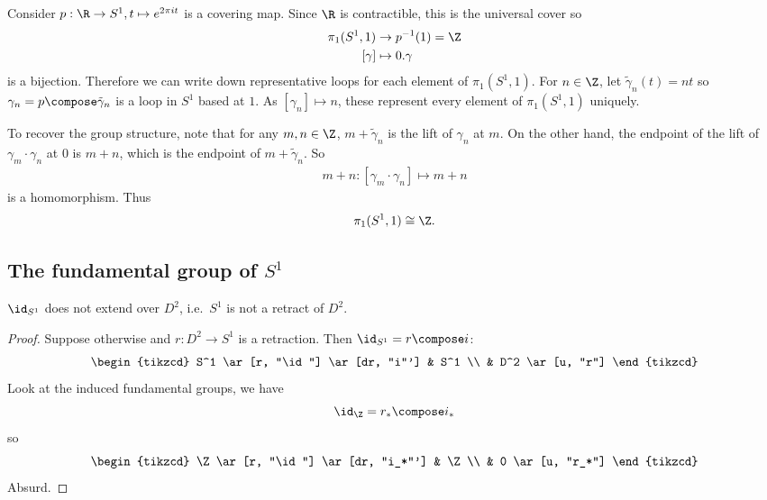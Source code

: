 \documentclass[a4paper]{article}
\begin{document}
\begin{eg}
  Consider \(p: \R \to S^1, t \mapsto e^{2\pi it}\) is a covering map. Since \(\R\) is contractible, this is the universal cover so
  \begin{align*}
    \pi_1(S^1, 1) &\to p^{-1}(1) = \Z \\
    [\gamma] &\mapsto 0. \gamma
  \end{align*}
  is a bijection. Therefore we can write down representative loops for each element of \(\pi_1(S^1, 1)\). For \(n \in \Z\), let \(\tilde \gamma_n(t) = nt\) so \(\gamma_n = p \compose \tilde \gamma_n\) is a loop in \(S^1\) based at \(1\). As \([\gamma_n] \mapsto n\), these represent every element of \(\pi_1(S^1, 1)\) uniquely.

  To recover the group structure, note that for any \(m, n \in \Z\), \(m + \tilde \gamma_n\) is the lift of \(\gamma_n\) at \(m\). On the other hand, the endpoint of the lift of \(\gamma_m \cdot \gamma_n\) at \(0\) is \(m + n\), which is the endpoint of \(m + \tilde \gamma_n\). So
  \begin{align*}
    m+n: [\gamma_m \cdot \gamma_n] \mapsto m + n
  \end{align*}
  is a homomorphism. Thus
  \[
    \pi_1(S^1, 1) \cong \Z.
  \]
\end{eg}

\subsection{The fundamental group of \(S^1\)}

\begin{theorem}
  \(\id_{S^1}\) does not extend over \(D^2\), i.e.\ \(S^1\) is not a retract of \(D^2\).
\end{theorem}

\begin{proof}
  Suppose otherwise and \(r: D^2 \to S^1\) is a retraction. Then \(\id_{S^1} = r \compose i\):
  \[
    \begin{tikzcd}
      S^1 \ar[r, "\id"] \ar[dr, "i"'] & S^1 \\
      & D^2 \ar[u, "r"]
    \end{tikzcd}
  \]
  Look at the induced fundamental groups, we have
  \[
    \id_\Z = r_* \compose i_*
  \]
  so
  \[
    \begin{tikzcd}
      \Z \ar[r, "\id"] \ar[dr, "i_*"'] & \Z \\
      & 0 \ar[u, "r_*"]
    \end{tikzcd}
  \]
  Absurd.
\end{proof}
\end{document}

